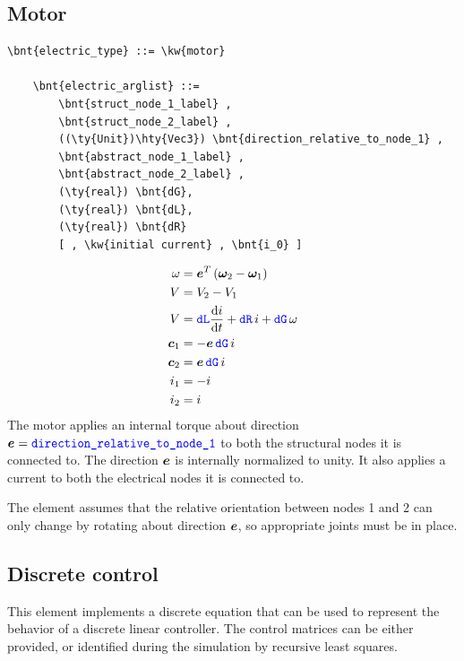 \subsection{Motor}
\begin{Verbatim}[commandchars=\\\{\}]
    \bnt{electric_type} ::= \kw{motor}

    \bnt{electric_arglist} ::=
        \bnt{struct_node_1_label} ,
        \bnt{struct_node_2_label} ,
        ((\ty{Unit})\hty{Vec3}) \bnt{direction_relative_to_node_1} ,
        \bnt{abstract_node_1_label} ,
        \bnt{abstract_node_2_label} ,
        (\ty{real}) \bnt{dG},
        (\ty{real}) \bnt{dL},
        (\ty{real}) \bnt{dR}
        [ , \kw{initial current} , \bnt{i_0} ]
\end{Verbatim}
\begin{subequations}
\begin{align}
	\omega &= \boldsymbol{e}^T \left( \boldsymbol{\omega}_2 - \boldsymbol{\omega}_1 \right) \\
	V &= V_2 - V_1 \\
	V &= \textcolor{blue}{\texttt{dL}} \frac{\mathrm{d}i}{\mathrm{d}t} + \textcolor{blue}{\texttt{dR}} \, i + \textcolor{blue}{\texttt{dG}} \, \omega \\
	\boldsymbol{c}_1 &= - \boldsymbol{e} \, \textcolor{blue}{\texttt{dG}} \, i \\
	\boldsymbol{c}_2 &= \boldsymbol{e} \, \textcolor{blue}{\texttt{dG}} \, i \\
	i_1 &= -i \\
	i_2 &= i
\end{align}
\end{subequations}
The motor applies an internal torque about direction
$\boldsymbol{e}=\textcolor{blue}{\texttt{direction\_relative\_to\_node\_1}}$
to both the structural nodes it is connected to.
The direction $\boldsymbol{e}$ is internally normalized to unity.
It also applies a current to both the electrical nodes it is connected to.

The element assumes that the relative orientation between nodes 1 and 2
can only change by rotating about direction $\boldsymbol{e}$, so appropriate
joints must be in place.


\subsection{Discrete control}\label{sec:EL:DISCCTRL}
This element implements a discrete equation
that can be used to represent the behavior
of a discrete linear controller.
The control matrices can be either provided,
or identified during the simulation by recursive least squares.

